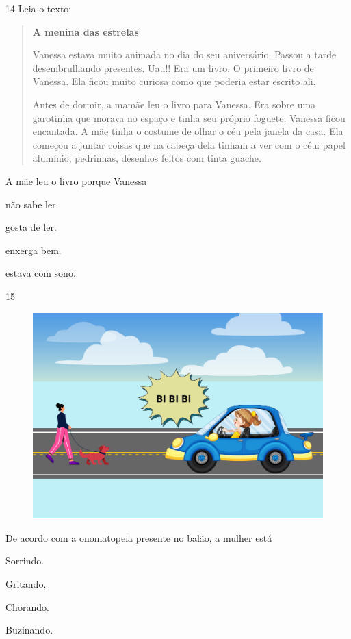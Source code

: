 \num{14} Leia o texto:

\begin{quote}
\textbf{A menina das estrelas}

Vanessa estava muito animada no dia do seu aniversário. Passou a tarde
desembrulhando presentes. Uau!! Era um livro. O primeiro livro de
Vanessa. Ela ficou muito curiosa como que poderia estar escrito ali.

Antes de dormir, a mamãe leu o livro para Vanessa. Era sobre uma
garotinha que morava no espaço e tinha seu próprio foguete. Vanessa
ficou encantada. A mãe tinha o costume de olhar o céu pela janela da
casa. Ela começou a juntar coisas que na cabeça dela tinham a ver com o
céu: papel alumínio, pedrinhas, desenhos feitos com tinta guache.
\end{quote}


A mãe leu o livro porque Vanessa

\begin{escolha}
\item não sabe ler.

\item gosta de ler.

\item enxerga bem.

\item estava com sono.
\end{escolha}


\num{15}

\begin{figure}[htpb!]
\centering
\includegraphics[width=.5\textwidth]{media/image182.png}
\end{figure}


De acordo com a onomatopeia presente no balão, a mulher está

\begin{escolha}
\item Sorrindo.

\item Gritando.

\item Chorando.

\item Buzinando.
\end{escolha}




